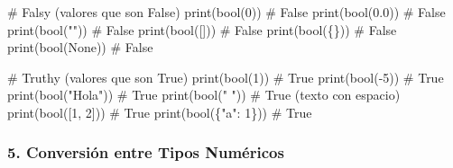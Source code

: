 \documentclass[
  doc,
  floatsintext,
  longtable,
  a4paper,
  nolmodern,
  notxfonts,
  notimes,
  12pt,
  colorlinks=true,linkcolor=blue,citecolor=blue,urlcolor=blue]{apa7}
\newenvironment{Shaded}{\begin{snugshade}}{\end{snugshade}}
\newcommand{\BuiltInTok}[1]{\textcolor[rgb]{0.00,0.23,0.31}{#1}}
\newcommand{\CommentTok}[1]{\textcolor[rgb]{0.37,0.37,0.37}{#1}}
\newcommand{\DecValTok}[1]{\textcolor[rgb]{0.68,0.00,0.00}{#1}}
\newcommand{\FloatTok}[1]{\textcolor[rgb]{0.68,0.00,0.00}{#1}}
\newcommand{\NormalTok}[1]{\textcolor[rgb]{0.00,0.23,0.31}{#1}}
\newcommand{\OperatorTok}[1]{\textcolor[rgb]{0.37,0.37,0.37}{#1}}
\newcommand{\StringTok}[1]{\textcolor[rgb]{0.13,0.47,0.30}{#1}}
\newcommand{\VariableTok}[1]{\textcolor[rgb]{0.07,0.07,0.07}{#1}}
\begin{document}
\begin{Shaded}
\begin{Highlighting}[]
\CommentTok{\# Falsy (valores que son False)}
\BuiltInTok{print}\NormalTok{(}\BuiltInTok{bool}\NormalTok{(}\DecValTok{0}\NormalTok{))      }\CommentTok{\# False}
\BuiltInTok{print}\NormalTok{(}\BuiltInTok{bool}\NormalTok{(}\FloatTok{0.0}\NormalTok{))    }\CommentTok{\# False}
\BuiltInTok{print}\NormalTok{(}\BuiltInTok{bool}\NormalTok{(}\StringTok{""}\NormalTok{))     }\CommentTok{\# False}
\BuiltInTok{print}\NormalTok{(}\BuiltInTok{bool}\NormalTok{([]))     }\CommentTok{\# False}
\BuiltInTok{print}\NormalTok{(}\BuiltInTok{bool}\NormalTok{(\{\}))     }\CommentTok{\# False}
\BuiltInTok{print}\NormalTok{(}\BuiltInTok{bool}\NormalTok{(}\VariableTok{None}\NormalTok{))   }\CommentTok{\# False}

\CommentTok{\# Truthy (valores que son True)}
\BuiltInTok{print}\NormalTok{(}\BuiltInTok{bool}\NormalTok{(}\DecValTok{1}\NormalTok{))      }\CommentTok{\# True}
\BuiltInTok{print}\NormalTok{(}\BuiltInTok{bool}\NormalTok{(}\OperatorTok{{-}}\DecValTok{5}\NormalTok{))     }\CommentTok{\# True}
\BuiltInTok{print}\NormalTok{(}\BuiltInTok{bool}\NormalTok{(}\StringTok{"Hola"}\NormalTok{)) }\CommentTok{\# True}
\BuiltInTok{print}\NormalTok{(}\BuiltInTok{bool}\NormalTok{(}\StringTok{" "}\NormalTok{))    }\CommentTok{\# True (texto con espacio)}
\BuiltInTok{print}\NormalTok{(}\BuiltInTok{bool}\NormalTok{([}\DecValTok{1}\NormalTok{, }\DecValTok{2}\NormalTok{])) }\CommentTok{\# True}
\BuiltInTok{print}\NormalTok{(}\BuiltInTok{bool}\NormalTok{(\{}\StringTok{"a"}\NormalTok{: }\DecValTok{1}\NormalTok{\})) }\CommentTok{\# True}
\end{Highlighting}
\end{Shaded}

\subsubsection{5. Conversión entre Tipos
Numéricos}\label{conversiuxf3n-entre-tipos-numuxe9ricos}
\end{document}
